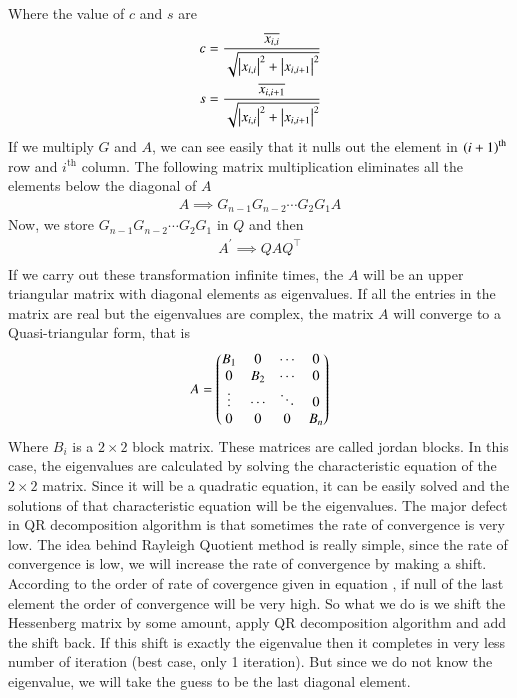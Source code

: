 \documentclass[journal]{IEEEtran}
\begin{document}
Where the value of $c$ and $s$ are
\begin{align}
	c = \frac{\overline{x_{i,i}}}{\sqrt{\left\vert x_{i,i}\right\vert^2+\left\vert x_{i,i+1}\right\vert^2}}\\
	s = \frac{\overline{x_{i,i+1}}}{\sqrt{\left\vert x_{i,i}\right\vert^2+\left\vert x_{i,i+1}\right\vert^2}}
\end{align}
If we multiply $G$ and $A$, we can see easily that it nulls out the element in $\left(i+1\right)^{\text{th}}$ row and $i^\text{th}$ column. The following matrix multiplication eliminates all the elements below the diagonal of $A$
\begin{align}
	A \implies G_{n-1}G_{n-2}\cdots G_2G_1A
\end{align}
Now, we store $G_{n-1}G_{n-2}\cdots G_2G_1$ in $Q$ and then
\begin{align}
	A^\prime \implies QAQ^\top\\
\end{align}
If we carry out these transformation infinite times, the $A$ will be an upper triangular matrix with diagonal elements as eigenvalues.
If all the entries in the matrix are real but the eigenvalues are complex, the matrix $A$ will converge to a Quasi-triangular form, that is
\begin{align}
	A = \begin{pmatrix}B_1 & 0 & \cdots & 0 \\
		   0 & B_2 & \cdots & 0\\
		   \vdots & \cdots & \ddots & 0\\
		   0 & 0 & 0 & B_n\end{pmatrix}
\end{align}
Where $B_i$ is a $2 \times 2$ block matrix. These matrices are called jordan blocks. In this case, the eigenvalues are calculated by solving the characteristic equation of the $2 \times 2$ matrix. Since it will be a quadratic equation, it can be easily solved and the solutions of that characteristic equation will be the eigenvalues.\newline
The major defect in QR decomposition algorithm is that sometimes the rate of convergence is very low. The idea behind Rayleigh Quotient method is really simple, since the rate of convergence is low, we will increase the rate of convergence by making a shift. According to the order of rate of covergence given in equation , if null of the last element  the order of convergence will be very high. So what we do is we shift the Hessenberg matrix by some amount, apply QR decomposition algorithm and add the shift back. If this shift is exactly the eigenvalue then it completes in very less number of iteration (best case, only 1 iteration). But since we do not know the eigenvalue, we will take the guess to be the last diagonal element.
\end{document}
